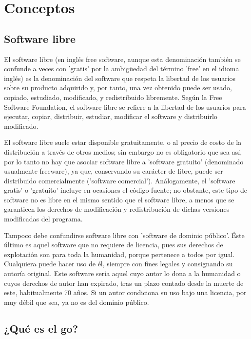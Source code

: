 \documentclass[12pt,a4paper]{report}
\begin{document}
\chapter{Conceptos}

\section{Software libre}

El software libre (en inglés free software, aunque esta denominación también se
confunde a veces con 'gratis' por la ambigüedad del término 'free' en el idioma
inglés) es la denominación del software que respeta la libertad de los usuarios
sobre su producto adquirido y, por tanto, una vez obtenido puede ser usado,
copiado, estudiado, modificado, y redistribuido libremente. Según la Free
Software Foundation, el software libre se refiere a la libertad de los usuarios
para ejecutar, copiar, distribuir, estudiar, modificar el software y
distribuirlo modificado.

El software libre suele estar disponible gratuitamente, o al precio de costo de
la distribución a través de otros medios; sin embargo no es obligatorio que sea
así, por lo tanto no hay que asociar software libre a 'software gratuito'
(denominado usualmente freeware), ya que, conservando su carácter de libre,
puede ser distribuido comercialmente ('software comercial'). Análogamente, el
'software gratis' o 'gratuito' incluye en ocasiones el código fuente; no
obstante, este tipo de software no es libre en el mismo sentido que el software
libre, a menos que se garanticen los derechos de modificación y redistribución
de dichas versiones modificadas del programa.

Tampoco debe confundirse software libre con 'software de dominio público'. Éste
último es aquel software que no requiere de licencia, pues sus derechos de
explotación son para toda la humanidad, porque pertenece a todos por igual.
Cualquiera puede hacer uso de él, siempre con fines legales y consignando su
autoría original. Este software sería aquel cuyo autor lo dona a la humanidad o
cuyos derechos de autor han expirado, tras un plazo contado desde la muerte de
este, habitualmente 70 años. Si un autor condiciona su uso bajo una licencia,
por muy débil que sea, ya no es del dominio público.


\section{¿Qué es el go?}
\end{document}
